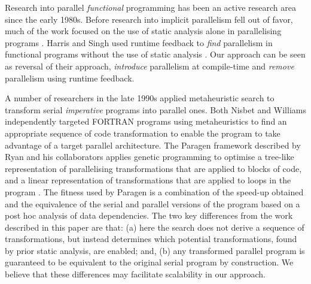 Research into parallel \emph{functional} programming has been an active research area
since the early 1980s. Before research into implicit parallelism fell out of
favor, much of the work focused on the use of static analysis alone in
parallelising programs \cite{hammond2000research, hogen1992automatic}. Harris
and Singh used runtime feedback to \emph{find} parallelism in functional
programs without the use of static analysis \cite{feedbackImplicit}. Our
approach can be seen as reversal of their approach, \emph{introduce}
parallelism at compile-time and \emph{remove} parallelism using runtime
feedback.

A number of researchers in the late 1990s applied metaheuristic search to transform serial \emph{imperative} programs into parallel ones.  Both Nisbet \cite{nisbet} and Williams \cite{williams:thesis} independently targeted FORTRAN programs using metaheuristics to find an appropriate sequence of code transformation to enable the program to take advantage of a target parallel architecture.  The Paragen framework described by Ryan and his collaborators applies genetic programming to optimise a tree-like representation of parallelising transformations that are applied to blocks of code, and a linear representation of transformations that are applied to loops in the program \cite{ryan1999automatic}.  The fitness used by Paragen is a combination of the speed-up obtained and the equivalence of the serial and parallel versions of the program based on a post hoc analysis of data dependencies.  The two key differences from the work described in this paper are that: (a) here the search does not derive a sequence of transformations, but instead determines which potential transformations, found by prior static analysis, are enabled; and, (b) any transformed parallel program is guaranteed to be equivalent to the original serial program by construction.  We believe that these differences may facilitate scalability in our approach.

